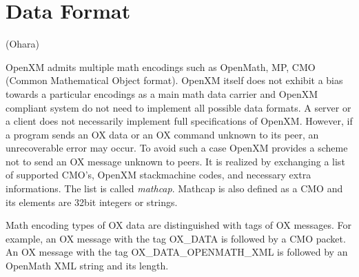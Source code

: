 
\section{Data Format}   (Ohara)

OpenXM admits multiple math encodings such as OpenMath, MP, CMO
(Common Mathematical Object format).
OpenXM itself does not exhibit a bias towards a particular encodings 
as a main math data carrier and OpenXM compliant system do not need to
implement all possible data formats.
A server or a client does not necessarily implement full specifications
of OpenXM. 
However, if a program sends an OX data or an OX command unknown to its peer, 
an unrecoverable error may occur. 
To avoid such a case OpenXM provides a scheme not
to send an OX message unknown to peers. 
It is realized by exchanging a list of
supported CMO's, OpenXM stackmachine codes, and necessary extra informations. 
The list is called {\it mathcap}.
Mathcap is also defined as a CMO and its elements are 32bit integers
or strings.

Math encoding types of OX data are distinguished with tags
of OX messages.
For example,
an OX message with the tag 
OX\_DATA is followed by a CMO packet.
An OX message with the tag 
OX\_DATA\_OPENMATH\_XML is followed by 
an OpenMath XML string and its length.

